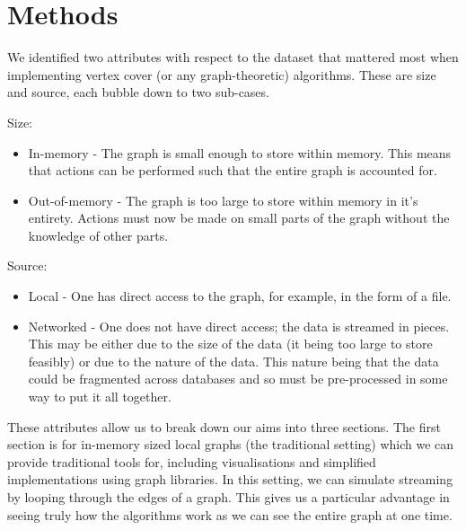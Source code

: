 \section{Methods}

We identified two attributes with respect to the dataset that mattered most
when implementing vertex cover (or any graph-theoretic) algorithms. These are
size and source, each bubble down to two sub-cases.

Size:

\begin{itemize}
    \item
          In-memory - The graph is small enough to store within memory. This
          means that actions can be performed such that the entire graph is
          accounted for.
    \item
          Out-of-memory - The graph is too large to store within memory in it's
          entirety. Actions must now be made on small parts of the graph
          without the knowledge of other parts.
\end{itemize}

Source:

\begin{itemize}
    \item
          Local - One has direct access to the graph, for example, in the form
          of a file.
    \item
          Networked - One does not have direct access; the data is streamed in
          pieces. This may be either due to the size of the data (it being too
          large to store feasibly) or due to the nature of the data. This
          nature being that the data could be fragmented across databases and
          so must be pre-processed in some way to put it all together.
\end{itemize}

These attributes allow us to break down our aims into three sections. The first
section is for in-memory sized local graphs (the traditional setting) which we
can provide traditional tools for, including visualisations and simplified
implementations using graph libraries. In this setting, we can simulate
streaming by looping through the edges of a graph. This gives us a particular
advantage in seeing truly how the algorithms work as we can see the entire
graph at one time.

